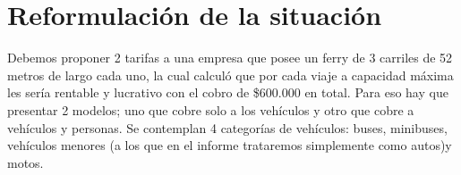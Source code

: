 \documentclass[a4paper]{article}
\begin{document}



\newpage

\tableofcontents
\newpage
\section{Reformulación de la situación}
Debemos proponer 2 tarifas a una empresa que posee un ferry de 3 carriles de 52 metros de largo cada uno, la cual calculó que por cada viaje a capacidad máxima les sería rentable y lucrativo con el cobro de \$600.000 en total. Para eso hay que presentar 2 modelos; uno que cobre solo a los vehículos y otro que cobre a vehículos y personas. Se contemplan 4 categorías de vehículos: buses, minibuses, vehículos menores (a los que en el informe trataremos simplemente como autos)y motos.
\end{document}
